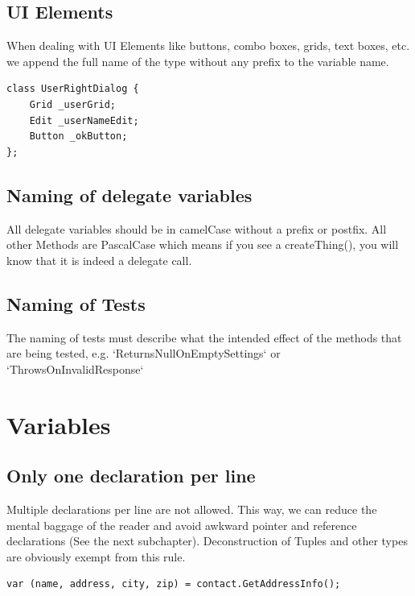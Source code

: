 \documentclass[11pt,a4paper]{article}
\begin{document}
\subsection{UI Elements}
When dealing with UI Elements like buttons, combo boxes, grids, text boxes, etc. we append the full name of the type without any prefix to the variable name. 

\begin{lstlisting}[language={[Sharp]C}, caption={Naming of UI Elements}]
class UserRightDialog {
    Grid _userGrid;
    Edit _userNameEdit;
    Button _okButton;
};
\end{lstlisting}

\subsection{Naming of delegate variables}

All delegate variables should be in camelCase without a prefix or postfix. All other Methods are PascalCase which means if you see a createThing(), you will know that it is indeed a delegate call.

\subsection{Naming of Tests}

The naming of tests must describe what the intended effect of the methods that are being tested, e.g. `ReturnsNullOnEmptySettings` or `ThrowsOnInvalidResponse`

\section{Variables}

\subsection{Only one declaration per line}

Multiple declarations per line are not allowed. This way, we can reduce the mental baggage of the reader and avoid awkward pointer and reference declarations (See the next subchapter).
Deconstruction of Tuples and other types are obviously exempt from this rule. 

\begin{lstlisting}[language={[Sharp]C}, caption={Example: tuple deconstruction}]
var (name, address, city, zip) = contact.GetAddressInfo();
\end{lstlisting}
\end{document}
